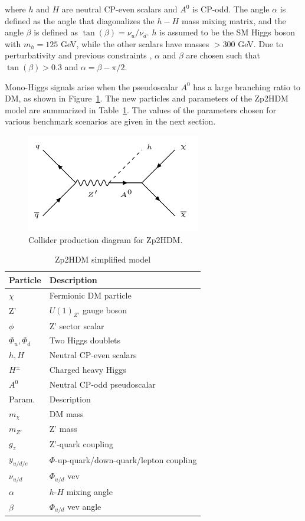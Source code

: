where $h$ and $H$ are neutral CP-even scalars and $A^0$ is CP-odd. The angle $\alpha$ is defined as the angle that diagonalizes the $h-H$ mass mixing matrix, and the angle $\beta$ is defined as $\tan(\beta) = \nu_u / \nu_d$. $h$ is assumed to be the SM Higgs boson with $m_h = 125$ GeV, while the other scalars have masses $> 300$ GeV. Due to perturbativity and previous constraints \cite{Craig:2013hca}, $\alpha$ and $\beta$ are chosen such that $\tan(\beta)>0.3$ and $\alpha = \beta - \pi/2$.

Mono-Higgs signals arise when the pseudoscalar $A^0$ has a large branching ratio to DM, as shown in Figure~\ref{fig:zp2hdmsig}. The new particles and parameters of the Zp2HDM model are summarized in Table~\ref{tab:Zp2HDM}. The values of the parameters chosen for various benchmark scenarios are given in the next section.

\begin{figure}[tbh]
\centering
\includegraphics[width=3in]{figures/zp2hdmsig.png}
\caption{Collider production diagram for Zp2HDM.}
\label{fig:zp2hdmsig}
\end{figure}

\begin{table}[htbH]
\begin{center}
\begin{tabular}{ l | l}
\hline
Particle & Description \\
\hline
$\chi$ & Fermionic DM particle \\
Z' & $U(1)_{Z'}$ gauge boson \\
$\phi$ & Z' sector scalar \\
$\Phi_u, \Phi_d$ & Two Higgs doublets \\
$h, H$ & Neutral CP-even scalars \\
$H^\pm$ & Charged heavy Higgs \\
$A^0$ & Neutral CP-odd pseudoscalar \\
\hline
Param. & Description \\
\hline
$m_\chi$ & DM mass \\
$m_{Z'}$ & Z' mass \\
$g_z$ & Z'-quark coupling \\
$y_{u/d/e}$ & $\Phi$-up-quark/down-quark/lepton coupling \\
$\nu_{u/d}$ & $\Phi_{u/d}$ vev \\
$\alpha$ & $h$-$H$ mixing angle \\
$\beta$ & $\Phi_{u/d}$ vev angle \\
\hline
\end{tabular}
\caption{Zp2HDM simplified model}\label{tab:Zp2HDM}
\end{center}
\end{table}


